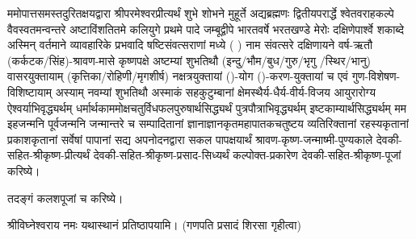ममोपात्तसमस्तदुरितक्षयद्वारा श्रीपरमेश्वरप्रीत्यर्थं शुभे शोभने मुहूर्ते अद्यब्रह्मणः
द्वितीयपरार्द्धे श्वेतवराहकल्पे वैवस्वतमन्वन्तरे अष्टाविंशतितमे कलियुगे प्रथमे पादे
जम्बूद्वीपे भारतवर्षे भरतखण्डे मेरोः दक्षिणेपार्श्वे शकाब्दे अस्मिन् वर्तमाने व्यावहारिके
प्रभवादि षष्टिसंवत्सराणां मध्ये (  ) नाम संवत्सरे दक्षिणायने वर्ष-ऋतौ  (कर्कटक/सिंह)-श्रावण-मासे 
कृष्णपक्षे अष्टम्यां शुभतिथौ (इन्दु/भौम/बुध/गुरु/भृगु /स्थिर/भानु) वासरयुक्तायाम्
(कृत्तिका/रोहिणी/मृगशीर्ष) नक्षत्रयुक्तायां ()-योग ()-करण-युक्तायां च एवं गुण-विशेषण-विशिष्टायाम्
अस्याम् नवम्यां शुभतिथौ अस्माकं सहकुटुम्बानां क्षेमस्थैर्य-धैर्य-वीर्य-विजय आयुरारोग्य ऐश्वर्याभिवृद्ध्यर्थम्
धर्मार्थकाममोक्ष\-चतुर्विधफलपुरुषार्थसिद्ध्यर्थं पुत्रपौत्राभिवृद्ध्यर्थम् इष्टकाम्यार्थसिद्ध्यर्थम्
मम इहजन्मनि पूर्वजन्मनि जन्मान्तरे च सम्पादितानां ज्ञानाज्ञानकृतमहा\-पातकचतुष्टय
व्यतिरिक्तानां रहस्यकृतानां प्रकाशकृतानां सर्वेषां पापानां सद्य अपनोदनद्वारा सकल 
पापक्षयार्थं 
श्रावण-कृष्ण-जन्माष्मी-पुण्यकाले देवकी-सहित-श्रीकृष्ण-प्रीत्यर्थं देवकी-सहित-श्रीकृष्ण-प्रसाद-सिध्यर्थं कल्पोक्त-प्रकारेण देवकी-सहित-श्रीकृष्ण-पूजां करिष्ये।

तदङ्गं कलशपूजां च करिष्ये।


श्रीविघ्नेश्वराय नमः यथास्थानं प्रतिष्ठापयामि।
(गणपति प्रसादं शिरसा गृहीत्वा)














